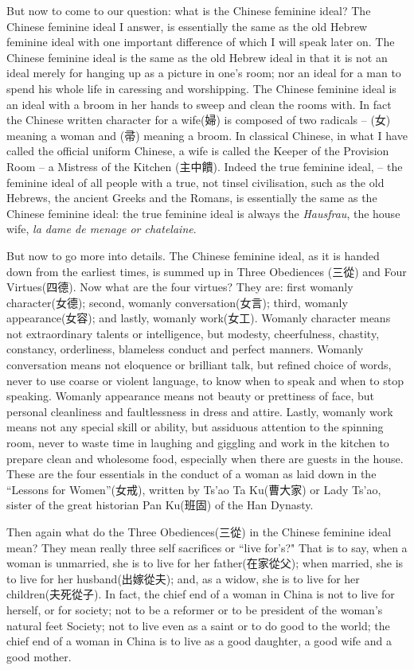 But now to come to our question: what is the Chinese feminine ideal?
The Chinese feminine ideal I answer, is essentially the same as the old Hebrew feminine ideal with one important difference of which I will speak later on.
The Chinese feminine ideal is the same as the old Hebrew ideal in that it is not an ideal merely for hanging up as a picture in one's room;
nor an ideal for a man to spend his whole life in caressing and worshipping.
The Chinese feminine ideal is an ideal with a broom in her hands to sweep and clean the rooms with.
In fact the Chinese written character for a wife(婦) is composed of two radicals
-- (女) meaning a woman and (帚) meaning a broom.
In classical Chinese, in what I have called the official uniform Chinese,
a wife is called the Keeper of the Provision Room -- a Mistress of the Kitchen (主中饋).
Indeed the true feminine ideal,
-- the feminine ideal of all people with a true, not tinsel civilisation,
such as the old Hebrews, the ancient Greeks and the Romans,
is essentially the same as the Chinese feminine ideal:
the true feminine ideal is always the \emph{Hausfrau}, the house wife,
\emph{la dame de menage or chatelaine}.

But now to go more into details.
The Chinese feminine ideal, as it is handed down from the earliest times,
is summed up in Three Obediences (三從) and Four Virtues(四德). Now what are the four virtues?
They are: first womanly character(女德); second, womanly conversation(女言); third, womanly appearance(女容); and lastly, womanly work(女工).
Womanly character means not extraordinary talents or intelligence, but modesty, cheerfulness, chastity, constancy, orderliness, blameless conduct and perfect manners. Womanly conversation means not eloquence or brilliant talk, but refined choice of words, never to use coarse or violent language, to know when to speak and when to stop speaking. Womanly appearance means not beauty or prettiness of face, but personal cleanliness and faultlessness in dress and attire. Lastly, womanly work means not any special skill or ability, but assiduous attention to the spinning room, never to waste time in laughing and giggling and work in the kitchen to prepare clean and wholesome food, especially when there are guests in the house. These are the four essentials in the conduct of a woman as laid down in the ``Lessons for Women''(女戒),
written by Ts'ao Ta Ku(曹大家) or Lady Ts'ao, sister of the great historian Pan Ku(班固) of the Han Dynasty.

Then again what do the Three Obediences(三從) in the Chinese feminine ideal mean?
They mean really three self sacrifices or ``live for's?"
That is to say, when a woman is unmarried, she is to live for her father(在家從父);
when married, she is to live for her husband(出嫁從夫);
and, as a widow, she is to live for her children(夫死從子).
In fact, the chief end of a woman in China is not to live for herself, or for society;
not to be a reformer or to be president of the woman's natural feet Society;
not to live even as a saint or to do good to the world;
the chief end of a woman in China is to live as a good daughter,
a good wife and a good mother.

